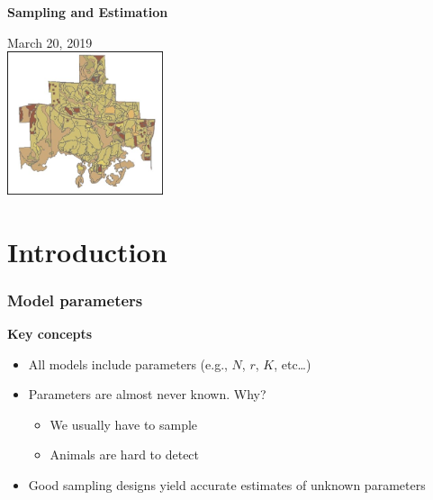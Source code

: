 \documentclass[color=usenames,dvipsnames]{beamer}\usepackage[]{graphicx}\usepackage[]{color}
\begin{document}
\begin{frame}[plain]
  \begin{center}
    {\huge \bf Sampling and Estimation \par}
    \vspace{0.5cm}
    { \Large March 20, 2019} \\
    \vfill
      \includegraphics[height=4.2cm,keepaspectratio]{figs/map} \hfill %
  \end{center}
\end{frame}






\section{Introduction}



\begin{frame}
  \frametitle{Model parameters}
  \large
  {\bf Key concepts}
  \begin{itemize}%
    \item<1-> All models include parameters (e.g., $N$, $r$, $K$, etc\dots)
    \item<2-> Parameters are almost never known. Why?
      \begin{itemize}
        \large
        \item<3-> We usually have to sample
        \item<3-> Animals are hard to detect
      \end{itemize}
    \item<4-> Good sampling designs yield accurate %
      estimates of unknown parameters
  \end{itemize}
\end{frame}
\end{document}
